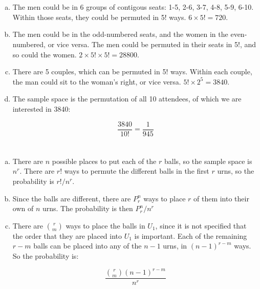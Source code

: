 \documentclass{article}
\begin{document}
\section{}
\begin{enumerate}[(a)]
\item
The men could be in 6 groups of contigous seats: 1-5, 2-6, 3-7, 4-8, 5-9, 6-10.
Within those seats, they could be permuted in 5! ways. $6 \times 5! = 720$.

\item
The men could be in the odd-numbered seats, and the women in the even-numbered,
or vice versa. The men could be permuted in their seats in 5!, and so could the
women. $2 \times 5! \times 5! = 28800$.

\item
There are 5 couples, which can be permuted in 5! ways. Within each couple, the
man could sit to the woman's right, or vice versa. $5! \times 2^5 = 3840$. 

\item
The sample space is the permutation of all 10 attendees, of which we are
interested in 3840:

\[
\frac{3840}{10!} = \frac{1}{945}
\]

\end{enumerate}

\section{}
\begin{enumerate}[(a)]
\item
There are $n$ possible places to put each of the $r$ balls, so the sample space
is $n^r$. There are $r!$ ways to permute the different balls in the first $r$
urns, so the probability is $r!/n^r$.

\item
Since the balls are different, there are $P^n_r$ ways to place $r$ of them
into their own of $n$ urns. The probability is then $P^n_r/n^r$

\item
There are ${{r}\choose{m}}$ ways to place the balls in $U_1$, since it is not
specified that the order that they are placed into $U_1$ is important. Each of
the remaining $r-m$ balls can be placed into any of the $n-1$ urns, in
$(n-1)^{r-m}$ ways. So the probability is:

\[
\frac{{{r}\choose{m}}(n-1)^{r-m}}{n^r}
\]

\end{enumerate}
\end{document}
